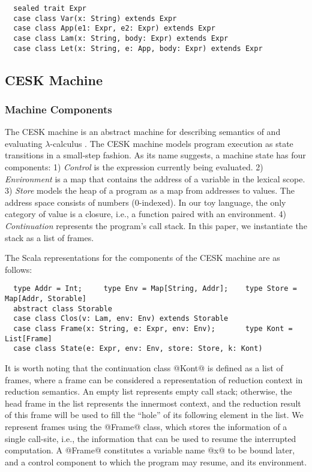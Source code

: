 \documentclass[acmsmall, review]{acmart}\settopmatter{}
\begin{document}
\begin{lstlisting}
  sealed trait Expr
  case class Var(x: String) extends Expr
  case class App(e1: Expr, e2: Expr) extends Expr
  case class Lam(x: String, body: Expr) extends Expr
  case class Let(x: String, e: App, body: Expr) extends Expr
\end{lstlisting}

\subsection{CESK Machine} \label{cesk}

\subsubsection{Machine Components}

The CESK machine is an abstract machine for describing semantics of and evaluating 
$\lambda$-calculus \cite{felleisen1987calculus}. The CESK machine models program execution 
as state transitions in a small-step fashion. As its name suggests, a machine state has 
four components:
1) \textit{Control} is the expression currently being evaluated.
2) \textit{Environment} is a map that contains the address of a variable in the lexical scope.
3) \textit{Store} models the heap of a program as a map from addresses to values.
  The address space consists of numbers (0-indexed).
  In our toy language, the only category of value is a closure, i.e., a function paired with
  an environment.
4) \textit{Continuation} represents the program's call stack. In this paper, we instantiate the 
stack as a list of frames. 

The Scala representations for the components of the CESK machine are as follows:

\begin{lstlisting}
  type Addr = Int;     type Env = Map[String, Addr];    type Store = Map[Addr, Storable]
  abstract class Storable
  case class Clos(v: Lam, env: Env) extends Storable
  case class Frame(x: String, e: Expr, env: Env);       type Kont = List[Frame]
  case class State(e: Expr, env: Env, store: Store, k: Kont)
\end{lstlisting}

It is worth noting that the continuation class @Kont@ is defined as a list of
frames, where a frame can be considered a representation of reduction context 
in reduction semantics.
An empty list represents empty call stack; otherwise, the head frame in the list
represents the innermost context, and the reduction result of this frame will be used
to fill the ``hole'' of its following element in the list.
We represent frames using the @Frame@ class, which stores the information of a single
call-site, i.e., the information that can be used to resume the interrupted computation.
A @Frame@ constitutes a variable name @x@ to be bound later, and a control component
to which the program may resume, and its environment.
\end{document}
